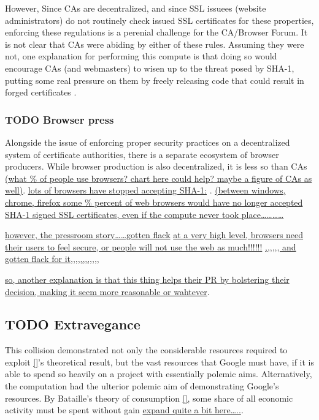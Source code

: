 \documentclass[sigconf]{acmart}
\begin{document}
However, Since CAs are decentralized, and since SSL issuees (website administrators) do not routinely check issued SSL certificates for these properties, enforcing these regulations is a perenial challenge for the CA/Browser Forum. It is not clear that CAs were abiding by either of these rules.
Assuming they were not, one explanation for performing this compute is that doing so would encourage CAs (and webmasters) to wisen up to the threat posed by SHA-1,
putting some real pressure on them by freely releasing code that could result in forged certificates \cite{Stevens2017github}.

\subsubsection{{\bfseries\sffamily TODO} Browser press}
\label{sec:org6371ea4}

Alongside the issue of enforcing proper security practices on a decentralized system of certificate authorities, 
there is a separate ecosystem of browser producers.
While browser production is also decentralized, it is less so than CAs
\uline{(what \% of people use browsers? chart here could help? maybe a figure of CAs as well)}.
\uline{lots of browsers have stopped accepting SHA-1:}
\cite{Sleevi2014,Mozilla2017}.
\uline{(between windows, chrome, firefox some \% percent of web browsers would have no longer accepted SHA-1 signed SSL certificates, even if the compute never took place\ldots{}\ldots{}\ldots{}\ldots{}}

\uline{however, the pressroom story\ldots{}\ldots{}gotten flack}
\uline{at a very high level, browsers need their users to feel secure, or people will not use the web as much!!!!!!}
\uline{,,,,,, and gotten flack for it,,,,,,,,,,,,}

\uline{so, another explanation is that this thing helps their PR by bolstering their decision, making it seem more reasonable or wahtever}.

\subsection{{\bfseries\sffamily TODO} Extravegance}
\label{sec:orgbe34373}

This collision demonstrated not only the considerable resources required to exploit \uline{[]}'s theoretical result,
but the vast resources that Google must have, if it is able to spend so heavily on a project with essentially polemic aims.
Alternatively, the computation had the ulterior polemic aim of demonstrating Google's resources.
By Bataille's theory of consumption \uline{[]}, some share of all economic activity must be spent without gain \uline{expand quite a bit here\ldots{}..}.
\end{document}
